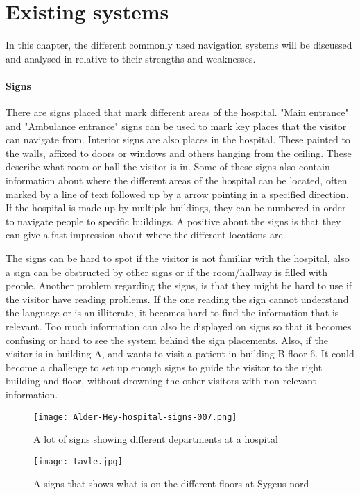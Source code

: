 \section{Existing systems} %
\label{sec:existing_systems}
In this chapter, the different commonly used navigation systems will be discussed and analysed in relative to their strengths and weaknesses.

\paragraph{Signs}
There are signs placed that mark different areas of the hospital. "Main entrance" and "Ambulance entrance"\cite{signs_hospital} signs can be used to mark key places that the visitor can navigate from\cite{art_Osborne}.
Interior signs are also places in the hospital. These painted to the walls, affixed to doors or windows\cite{signs_wall} and others hanging from the ceiling. These describe what room or hall the visitor is in. Some of these signs also contain information about where the different areas of the hospital can be located, often marked by a line of text followed up by a arrow pointing in a specified direction\cite{signs_hospital2}. If the hospital is made up by multiple buildings, they can be numbered in order to navigate people to specific buildings. 
A positive about the signs is that they can give a fast impression about where the different locations are.

The signs can be hard to spot if the  visitor is not familiar with the hospital, also a sign can be obstructed by other signs or if the room/hallway is filled with people. Another problem regarding the signs, is that they might be hard to use if the visitor have reading problems. If the one reading the sign cannot understand the language or is an illiterate, it becomes hard to find the information that is relevant\cite{signs_reading}. Too much information can also be displayed on signs so that it becomes confusing or hard to see the system behind the sign placements.
Also, if the visitor is in building A, and wants to visit a patient in building B floor 6. It could become a challenge to set up enough signs to guide the visitor to the right building and floor, without drowning the other visitors with non relevant information.

  \begin{figure}[ht!]
  \centering
  \texttt{[image: Alder-Hey-hospital-signs-007.png]}
  \caption{A lot of signs showing different departments at a hospital\cite{signs_hospital}}
  \label{overflow}
  \end{figure}
  \begin{figure}[ht!]
  \centering
  \texttt{[image: tavle.jpg]}
  \caption{A signs that shows what is on the different floors at Sygeus nord}
  \label{overflow}
  \end{figure}  
